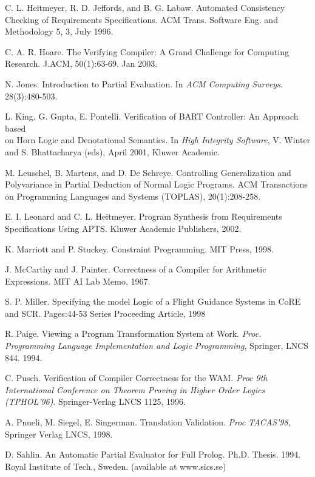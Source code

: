 \documentclass{entcs}
\begin{document}
\begin{thebibliography}{10}
C. L. Heitmeyer, R. D. Jeffords, and B. G. Labaw. Automated Consistency Checking of 
Requirements Specifications. ACM Trans. Software Eng. and Methodology 5, 3, July 1996.

 C. A. R. Hoare. The Verifying Compiler: A Grand
	Challenge for Computing Research. J.ACM, 50(1):63-69. Jan 2003.

 N. Jones. Introduction to Partial Evaluation.
	In {\it ACM Computing Surveys}. 28(3):480-503.

L. King, G. Gupta, E. Pontelli. 
	Verification of BART Controller: An Approach based\\
	on Horn Logic and Denotational Semantics.
        In {\it High Integrity Software}, 
	V. Winter and S. Bhattacharya (eds), April 2001,
	Kluwer Academic.

M. Leuschel, B. Martens, and D. De Schreye. 
Controlling Generalization and Polyvariance in Partial Deduction of Normal Logic Programs. 
ACM Transactions on Programming Languages and Systems (TOPLAS), 20(1):208-258.

E. I. Leonard and C. L. Heitmeyer. Program Synthesis from Requirements Specifications 
Using APTS. Kluwer Academic Publishers, 2002.

K. Marriott and P. Stuckey.
Constraint Programming. MIT Press, 1998.

J. McCarthy and J. Painter.
Correctness of a Compiler for Arithmetic Expressions. 
MIT AI Lab Memo, 1967.

S. P. Miller. Specifying the model Logic of a Flight Guidance Systems in CoRE and SCR. 
Pages:44-53 Series Proceeding Article, 1998 

 R. Paige. Viewing a Program Transformation System
	at Work. {\it Proc. Programming Language Implementation
		and Logic Programming}, Springer, LNCS 844. 1994.

C. Pusch.  Verification of Compiler Correctness for the {WAM}.
{\it Proc 9th International Conference on Theorem Proving 
in Higher Order Logics ({TPHOL}'96)}.
Springer-Verlag LNCS 1125, 1996.

A. Pnueli, M. Siegel, E. Singerman.  Translation Validation.
{\it Proc TACAS'98}, Springer Verlag LNCS, 1998.


 D. Sahlin. An Automatic Partial 
	Evaluator for Full Prolog. 
	Ph.D. Thesis. 1994. Royal Institute of Tech., Sweden.
	(available at www.sics.se)


\end{thebibliography}
\end{document}
